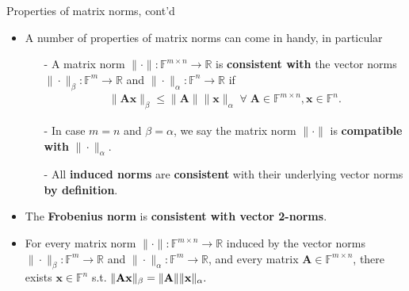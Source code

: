 \documentclass[t,usepdftitle=false]{beamer}
\begin{document}
\begin{frame}{Properties of matrix norms, cont'd}
\begin{itemize} 
\item A number of properties of matrix norms can come in handy, in particular
\begin{definition}
\begin{itemize}
\item[-] A matrix norm $\|\cdot\|:\mathbb{F}^{m\times n}\rightarrow \mathbb{R}$ is \textbf{consistent with} the vector norms $\|\cdot\|_\beta:\mathbb{F}^{m}\rightarrow \mathbb{R}$ and $\|\cdot\|_\alpha:\mathbb{F}^{n}\rightarrow \mathbb{R}$ if
\begin{align*}
\|\mathbf{A}\mathbf{x}\|_\beta\leq\|\mathbf{A}\|\|\mathbf{x}\|_\alpha\;\forall\;\mathbf{A}\in\mathbb{F}^{m\times n},\mathbf{x}\in\mathbb{F}^n.
\end{align*}
\item[-] In case $m=n$ and $\beta=\alpha$, we say the matrix norm $\|\cdot\|$ is \textbf{compatible with} $\|\cdot\|_\alpha$.
\item[-] All \textbf{induced norms} are \textbf{consistent} with their underlying vector norms \textbf{by definition}.
\end{itemize}
\end{definition}
\item The \textbf{Frobenius norm} is \textbf{consistent with vector 2-norms}.
\item For every matrix norm $\|\cdot\|:\mathbb{F}^{m\times n}\rightarrow\mathbb{R}$ induced by the vector norms $\|\cdot\|_\beta:\mathbb{F}^{m}\rightarrow \mathbb{R}$ and $\|\cdot\|_\alpha:\mathbb{F}^{m}\rightarrow \mathbb{R}$, and every matrix $\mathbf{A}\in\mathbb{F}^{m\times n}$, there exists $\mathbf{x}\in\mathbb{F}^n$ s.t. $\|\mathbf{Ax}\|_\beta=\|\mathbf{A}\|\|\mathbf{x}\|_\alpha.\hspace{-2cm}$
\end{itemize}
\end{frame}
\end{document}
